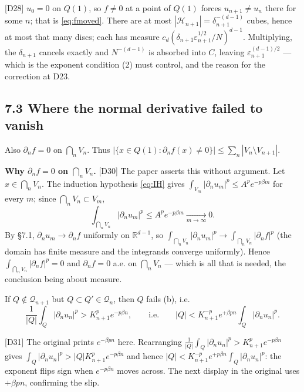 \documentclass[11pt,reqno]{amsart}
\theoremstyle{plain}
\theoremstyle{definition}
\theoremstyle{plain}
\theoremstyle{definition}
\theoremstyle{remark}
\newcommand{\Rdm}{\mathbb{R}^{d-1}}
\newcommand{\nd}{\partial_n}
\newcommand{\Ledger}[1]{{\scriptsize\textsf{[#1]}}}
\begin{document}
\begin{expansion}
\Ledger{D28} $u_0=0$ on $Q(1)$, so $f\ne0$ at a point of $Q(1)$ forces
$u_{n+1}\ne u_n$ there for some $n$; that is \eqref{eq:fmoved}. There are at most
$|\mathcal H_{n+1}|=\delta_{n+1}^{-(d-1)}$ cubes, hence at most that many discs;
each has measure $c_d(\delta_{n+1}\varepsilon_{n+1}^{1/2}/N)^{d-1}$. Multiplying,
the $\delta_{n+1}$ cancels exactly and $N^{-(d-1)}$ is absorbed into $C$, leaving
$\varepsilon_{n+1}^{(d-1)/2}$ --- which is the exponent condition (2) must control,
and the reason for the correction at D23.
\end{expansion}

\subsection*{7.3 Where the normal derivative failed to vanish}

Also $\nd f=0$ on $\bigcap_nV_n$. Thus
$\bigl|\{x\in Q(1):\nd f(x)\ne0\}\bigr|\le\sum_n|V_n\setminus V_{n+1}|$.

\begin{filled}
\textbf{Why $\nd f=0$ on $\bigcap_nV_n$.} \Ledger{D30} The paper asserts this
without argument. Let $x\in\bigcap_nV_n$. The induction hypothesis \eqref{eq:IH}
gives $\int_{V_m}|\nd u_m|^p\le A^pe^{-p\beta m}$ for every $m$; since
$\bigcap_nV_n\subset V_m$,
\[\int_{\bigcap_nV_n}\bigl|\nd u_m\bigr|^p\le A^pe^{-p\beta m}\xrightarrow[m\to\infty]{}0 .\]
By \S7.1, $\nd u_m\to\nd f$ uniformly on $\Rdm$, so
$\int_{\bigcap_nV_n}|\nd u_m|^p\to\int_{\bigcap_nV_n}|\nd f|^p$ (the domain has
finite measure and the integrands converge uniformly). Hence
$\int_{\bigcap_nV_n}|\nd f|^p=0$ and $\nd f=0$ a.e. on $\bigcap_nV_n$ --- which is
all that is needed, the conclusion being about measure.
\end{filled}

If $Q\notin\mathcal Q_{n+1}$ but $Q\subset Q'\in\mathcal Q_n$, then $Q$ fails (b),
i.e.
\[\frac1{|Q|}\int_Q\bigl|\nd u_n\bigr|^p>K_{n+1}^pe^{-p\beta n},
 \qquad\text{i.e.}\qquad
 |Q|<K_{n+1}^{-p}e^{+\beta pn}\int_Q\bigl|\nd u_n\bigr|^p .\]

\begin{expansion}
\Ledger{D31} The original prints $e^{-\beta pn}$ here. Rearranging
$\frac1{|Q|}\int_Q|\nd u_n|^p>K_{n+1}^pe^{-p\beta n}$ gives
$\int_Q|\nd u_n|^p>|Q|K_{n+1}^pe^{-p\beta n}$ and hence
$|Q|<K_{n+1}^{-p}e^{+p\beta n}\int_Q|\nd u_n|^p$: the exponent flips sign when
$e^{-p\beta n}$ moves across. The next display in the original uses $+\beta pn$,
confirming the slip.
\end{expansion}
\end{document}

